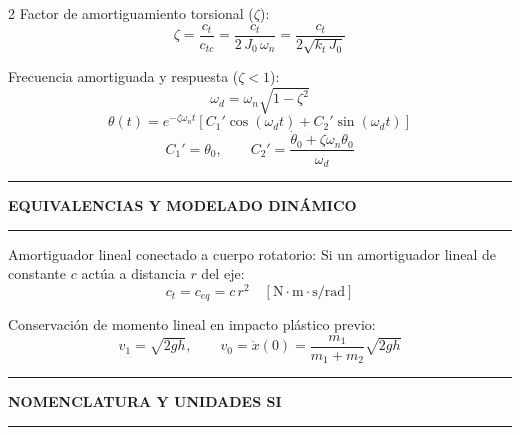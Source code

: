 \documentclass[10pt,a4paper]{article}
\newcommand{\seccion}[1]{%
  \vspace{1.5mm}\hrule\vspace{1mm}%
  \textbf{\footnotesize\MakeUppercase{#1}}\vspace{1mm}\hrule\vspace{1.5mm}}
\begin{document}
\begin{multicols}{2}
Factor de amortiguamiento torsional ($\zeta$):
\begin{equation*}
  \zeta = \frac{c_t}{c_{tc}} = \frac{c_t}{2\,J_0\,\omega_n} = \frac{c_t}{2\sqrt{k_t\,J_0}}
\end{equation*}

Frecuencia amortiguada y respuesta ($\zeta < 1$):
\begin{equation*}
  \omega_d = \omega_n\sqrt{1-\zeta^{2}}
\end{equation*}
\begin{equation*}
  \theta(t) = e^{-\zeta\omega_n t}\left[ C_1'\cos(\omega_d t) + C_2'\sin(\omega_d t) \right]
\end{equation*}
\begin{equation*}
  C_1' = \theta_0,
  \qquad
  C_2' = \frac{\dot{\theta}_0 + \zeta\omega_n\theta_0}{\omega_d}
\end{equation*}

\seccion{Equivalencias y Modelado Dinámico}

Amortiguador lineal conectado a cuerpo rotatorio:
Si un amortiguador lineal de constante $c$ actúa a distancia $r$ del eje:
\begin{equation*}
  c_t = c_{eq} = c\,r^{2} \quad [\mathrm{N\cdot m\cdot s/rad}]
\end{equation*}

Conservación de momento lineal en impacto plástico previo:
\begin{equation*}
  v_1 = \sqrt{2gh},
  \qquad
  v_0 = \dot{x}(0) = \frac{m_1}{m_1 + m_2}\sqrt{2gh}
\end{equation*}

\seccion{Nomenclatura y Unidades SI}


\end{multicols}
\end{document}

